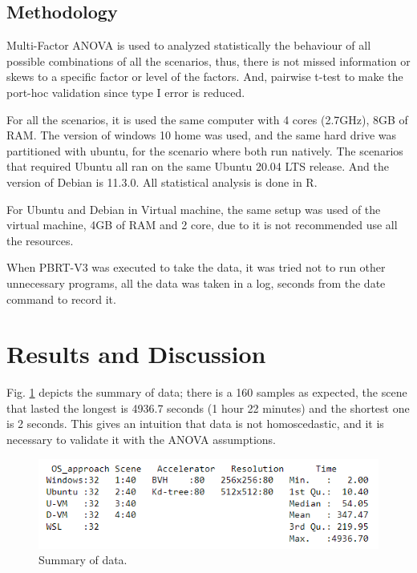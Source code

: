 \documentclass[conference]{IEEEtran}
\begin{document}
\subsection{Methodology}
Multi-Factor ANOVA is used to analyzed statistically the behaviour of all possible combinations of all the scenarios, thus, there is not missed information or skews to a specific factor or level of the factors. And, pairwise t-test to make the port-hoc validation since type I error is reduced.\par
For all the scenarios, it is used the same computer with 4 cores (2.7GHz), 8GB of RAM. The version of windows 10 home was used, and the same hard drive was partitioned with ubuntu, for the scenario where both run natively. The scenarios that required Ubuntu all ran on the same Ubuntu 20.04 LTS release. And the version of Debian is 11.3.0. All statistical analysis is done in R. \par
For Ubuntu and Debian in Virtual machine, the same setup was used of the virtual machine, 4GB of RAM and 2 core, due to it is not recommended use all the resources. \par
When PBRT-V3 was executed to take the data, it was tried not to run other unnecessary programs, all the data was taken in a log, seconds from the date command to record it.\par



\section{Results and Discussion}
Fig. \ref{fig_summary} depicts the summary of data; there is a 160 samples as expected, the scene that lasted the longest is 4936.7 seconds (1 hour 22 minutes) and the shortest one is 2 seconds. This gives an intuition that data is not homoscedastic, and it is necessary to validate it with the ANOVA assumptions.
\begin{figure}[b]
    \centering
    \includegraphics[scale=0.6]{figures/summary.png}
    \caption{Summary of data.}
    \label{fig_summary}
\end{figure}
\end{document}
